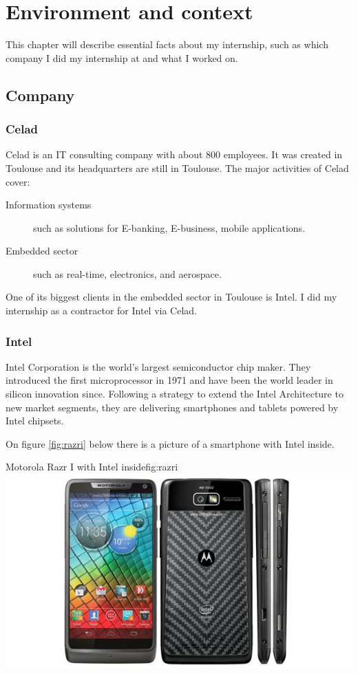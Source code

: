 \chapter{Environment and context}\label{chap:context}

\begin{sectionIntro}
    This chapter will describe essential facts about my internship, such as
    which company I did my internship at and what I worked on.
\end{sectionIntro}

\section{Company}

\subsection{Celad}
Celad is an IT consulting company with about 800 employees. It was created in Toulouse
and its headquarters are still in Toulouse.
The major activities of Celad cover:
\begin{description}
    \item [Information systems] such as solutions for E-banking, E-business, mobile applications.
    \item [Embedded sector] such as real-time, electronics, and aerospace.
\end{description}
One of its biggest clients in the embedded sector in Toulouse is Intel.
I did my internship as a contractor for Intel via Celad.

\subsection{Intel}
Intel Corporation is the world’s largest semiconductor chip maker. They
introduced the first microprocessor in 1971 and have been the world leader in
silicon innovation since.
Following a strategy to extend the Intel Architecture to new market segments,
they are delivering smartphones and tablets powered by Intel chipsets.

On figure \ref{fig:razri} below there is a picture of a smartphone with Intel inside.

\begin{figureGraphics}{Motorola Razr I with Intel inside}{fig:razri}
    \includegraphics[width=\textwidth]{./src/img/razri.jpg}
\end{figureGraphics}

